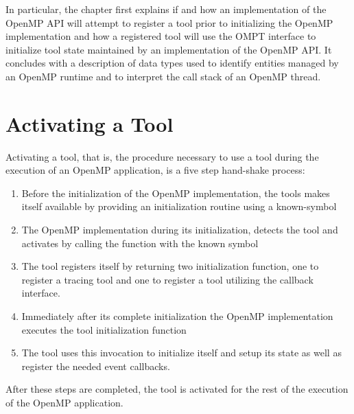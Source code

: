 In particular,
the chapter first explains if and how an implementation of
the OpenMP API will attempt to register a tool prior to initializing the 
OpenMP implementation and
how a registered tool will use the OMPT interface to initialize tool state maintained by
an implementation of the OpenMP API.
It concludes with a description of data types
used to identify entities managed by an OpenMP runtime and to interpret the
call stack of an OpenMP thread.

\section{Activating a Tool}
Activating a tool, that is, the procedure necessary to use a tool during the
execution of an OpenMP application, is a five step hand-shake process: 

\begin{enumerate}

\item Before
the initialization of the OpenMP implementation, the tools makes itself available by
providing an initialization routine using a known-symbol

\item The OpenMP
implementation during its initialization, detects the tool and activates by calling
the function with the known symbol

\item The tool registers itself by returning 
two initialization function, one to register a tracing tool and one to register a tool
utilizing the callback interface.

\item Immediately after its complete initialization the OpenMP implementation
executes the tool
initialization function

\item The tool uses this invocation to initialize
itself and setup its state as well as register the needed event callbacks. 

\end{enumerate}

After these steps
are completed, the tool is activated for the rest of the execution of the OpenMP
application.
%
%
%

